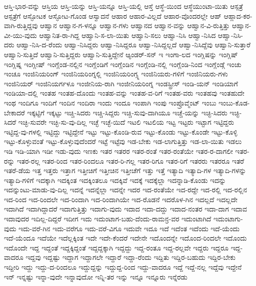 {ಆಸ್ತಿ-ಭಾರ-ವನ್ನು
ಆಸ್ತಿಯ
ಆಸ್ತಿ-ಯನ್ನು
ಆಸ್ತಿ-ಯನ್ನೂ
ಆಸ್ತಿ-ಯಲ್ಲಿ
ಆಸ್ತೆ
ಆಸ್ಥೆ-ಯಿಂದ
ಆಸ್ಥೆಯುಂಟಾ-ಯಿತು
ಆಸ್ಪತ್ರೆ
ಆಸ್ಪತ್ರೆಗೆ
ಆಸ್ಫೋಟಕ
ಆಸ್ಫೋಟ-ಗೊಂಡ
ಆಸ್ವಾದನೆ
ಆಹಾರ
ಆಹಾರ-ವಿಲ್ಲದೆ
ಆಹಾರ-ವೊಂದರಲ್ಲೇ
ಆಹ್
ಆಹ್ಲಾದ-ಕರ-ವಾಗಿ-ರುತ್ತಿದ್ದವು
ಆಹ್ವಾನ
ಆಹ್ವಾನ-ಗ-ಳನ್ನೂ
ಆಹ್ವಾನ-ಗಳು
ಆಹ್ವಾನದ
ಆಹ್ವಾನ-ವನ್ನು
ಆಹ್ವಾನ-ವಿ-ರುತ್ತಿತ್ತು
ಆಹ್ವಾನ-ವೀ-ಯು-ವುದು
ಆಹ್ವಾನಿತ-ರಾ-ಗಿದ್ದ
ಆಹ್ವಾನಿ-ಸ-ಲಾ-ಯಿತು
ಆಹ್ವಾನಿ-ಸಲು
ಆಹ್ವಾ-ನಿಸಿ
ಆಹ್ವಾ-ನಿಸಿದ
ಆಹ್ವಾ-ನಿಸಿ-ದರು
ಆಹ್ವಾ-ನಿಸಿ-ದ-ರೆಂದು
ಆಹ್ವಾ-ನಿಸಿದ್ದರು
ಆಹ್ವಾ-ನಿಸಿದ್ದರೂ
ಆಹ್ವಾ-ನಿಸಿದ್ದಲ್ಲದೆ
ಆಹ್ವಾ-ನಿಸಿದ್ದೆವು
ಆಹ್ವಾನಿ-ಸುತ್ತಾರೆ
ಆಹ್ವಾನಿ-ಸುತ್ತಿದೆ
ಆಹ್ವಾನಿ-ಸುತ್ತಿದ್ದರು
ಆಹ್ವಾನಿ-ಸುತ್ತಿದ್ದೇನೆ
ಆ್ಯಂಡರ್-ಸನ್
ಇ
ಇಂಗಾ-ಲದ
ಇಂಗ್ಲಿಷನ್ನು
ಇಂಗ್ಲಿಷ್
ಇಂಗ್ಲಿಷ್ನ
ಇಂಗ್ಲೀಷ್
ಇಂಗ್ಲೆಂಡ-ನಲ್ಲಿನ
ಇಂಗ್ಲೆಂಡಿಗೆ
ಇಂಗ್ಲೆಂಡಿನ
ಇಂಗ್ಲೆಂಡಿ-ನಲ್ಲಿ
ಇಂಗ್ಲೆಂಡಿ-ನಿಂದ
ಇಂಗ್ಲೆಂಡ್ಗೆ
ಇಂಚು
ಇಂಚೂ
ಇಂಜಿನಿಯರಿಂಗ್
ಇಂಜಿನಿಯರಿಂಗ್ನಲ್ಲಿ
ಇಂಜಿನಿಯರಿಂಗ್ಸ್ನ
ಇಂಜಿನಿಯರು-ಗಳಿಗೆ
ಇಂಜಿನಿಯರು-ಗಳು
ಇಂಜಿನಿಯರ್
ಇಂಜಿನಿಯರ್ಗಳೂ
ಇಂಜೀನಿಯ-ರಾಗಿ
ಇಂಜೀನಿಯರಿಂಗ್ನ
ಇಂಡಸ್ಟ್ರೀಸ್
ಇಂಡಿ-ಯನ್
ಇಂಡಿಯಾಗೆ
ಇಂಡಿಯಾ-ದಲ್ಲಿ
ಇಂತಹ
ಇಂತಹ-ದೊಂದು
ಇಂತಹ-ವನ್ನು
ಇಂತಹ-ವ-ರಿಗೆ
ಇಂತಹ-ವರು
ಇಂತಹವು
ಇಂತಹುದೇ
ಇಂಥ
ಇಂದಿಗೂ
ಇಂದಿಗೆ
ಇಂದಿನ
ಇಂದಿರಾ
ಇಂದು
ಇಂದೂ
ಇಂಪಾಗಿ
ಇಂಪು
ಇಂಪ್ರೊವ್ಮೆಂಟ್
ಇಂಬು
ಇಂಬು-ಕೊಡ-ಬೇಕಾದರೆ
ಇಕ್ಕಟ್ಟಿಗೆ
ಇಕ್ಕಟ್ಟು
ಇಚ್ಚಿ-ಸಿದರು
ಇಚ್ಚಿ-ಸಿದ್ದರು
ಇಚ್ಚಿ-ಸುವು-ದಾಗಿಯೂ
ಇಚ್ಚೆ-ಯನ್ನು
ಇಚ್ಛಿ-ಸಿದರು
ಇಚ್ಛಿ-ಸಿದರೆ
ಇಚ್ಛಿ-ಸುವರೇ
ಇಚ್ಛಿ-ಸು-ವು-ದಿಲ್ಲ
ಇಚ್ಛೆ
ಇಚ್ಛೆ-ಯಿದೆ
ಇಟಲಿ
ಇಟಲಿಯ
ಇಟ್ಟ
ಇಟ್ಟರು
ಇಟ್ಟಾಗ
ಇಟ್ಟಿದ್ದರು
ಇಟ್ಟಿದ್ದ-ವು-ಗಳಲ್ಲಿ
ಇಟ್ಟಿದ್ದು
ಇಟ್ಟಿದ್ದೇನೆ
ಇಟ್ಟು
ಇಟ್ಟು-ಕೊಂಡಿ-ರುವ
ಇಟ್ಟು-ಕೊಂಡು
ಇಟ್ಟು-ಕೊಂಡೇ
ಇಟ್ಟು-ಕೊಳ್ಳಿ
ಇಟ್ಟು-ಕೊಳ್ಳುವಂತೆ
ಇಟ್ಟು-ಕೊಳ್ಳುವುದೆಂದರೆ
ಇಟ್ಟೆ
ಇಟ್ಟೆವು
ಇಡ-ಬೇಕು
ಇಡ-ಲಾಗುತ್ತಿತ್ತು
ಇಡ-ಲಾ-ಯಿತು
ಇಡಲು
ಇಡಿ
ಇಡಿ-ಯಾಗಿ
ಇಡೀ
ಇಡು-ವುದು
ಇಣಕು
ಇತರ
ಇತರರ
ಇತರ-ರಂತೆ
ಇತರ-ರಂತೆಯೇ
ಇತರ-ರ-ದಾಗಲೀ
ಇತರ-ರನ್ನು
ಇತರ-ರಲ್ಲ
ಇತರ-ರಿಂದ
ಇತರ-ರಿಂದಲೂ
ಇತರ-ರಿ-ಗಲ್ಲ
ಇತರ-ರಿಗೂ
ಇತರ-ರಿಗೆ
ಇತರರು
ಇತರರೂ
ಇತರೆ
ಇತರೆ-ಡೆಯ
ಇತ್ತ
ಇತ್ತರು
ಇತ್ತಾಗ
ಇತ್ತೀಚಿಗೆ
ಇತ್ತೀಚಿನ
ಇತ್ತೀಚೆಗೆ
ಇತ್ತು
ಇತ್ತೆ
ಇತ್ಯಾದಿ
ಇತ್ಯಾದಿ-ಗಳ
ಇತ್ಯಾದಿ-ಗಳನ್ನು
ಇತ್ಯಾದಿ-ಗಳಿಗೆ
ಇದಕ್ಕಾಗಿ
ಇದಕ್ಕಿಂತ
ಇದಕ್ಕಿಂತಲೂ
ಇದಕ್ಕಿವೆ
ಇದಕ್ಕೆ
ಇದಕ್ಕೆಲ್ಲಾ
ಇದನ್ನಾಡಿ-ಕೊಂಡು
ಇದನ್ನು
ಇದನ್ನುಂಟು-ಮಾಡು-ವು-ದಿಲ್ಲ
ಇದನ್ನೆ
ಇದನ್ನೆಲ್ಲಾ
ಇದನ್ನೇ
ಇದರ
ಇದ-ರಂತೆಯೇ
ಇದ-ರದ್ದೇ
ಇದ-ರಲ್ಲಿ
ಇದ-ರಲ್ಲಿನ
ಇದ-ರಿಂದ
ಇದ-ರಿಂದಲೇ
ಇದ-ರಿಂದಾಗಿ
ಇದ-ರಿಂದಾಗಿಯೇ
ಇದ-ರೊಡನೆ
ಇದರೊಳ-ಗಿನ
ಇದಲ್ಲದೆ
ಇದಲ್ಲದೇ
ಇದಾಗಿದೆ
ಇದಾಗಿದ್ದಾದರೆ
ಇದಾಗುತ್ತಿತ್ತು
ಇದಾಗು-ವುದು
ಇದಾದ
ಇದಾ-ದದ್ದು
ಇದಾದ-ನಂತರ
ಇದಾ-ದಾಗ
ಇದಾವ
ಇದಾವುದರ
ಇದಿಲ್ಲ-ದಿದ್ದರೆ
ಇದೀಗ
ಇದು
ಇದುಂಟಾಗ-ಬಹು-ದೆಂದು-ರಾಮನ್ರ-ವರ
ಇದುಂಟಾಗಿದೆ
ಇದುಂಟಾಗು-ವುದು
ಇದು-ವರೆ-ಗಿನ
ಇದು-ವರೆಗೂ
ಇದು-ವರೆ-ವಿಗೂ
ಇದುವೇ
ಇದೂ
ಇದೆ
ಇದೆಂತ
ಇದೆಂದು
ಇದೆ-ಯೆಂದು
ಇದೆ-ಯೆಂದೂ
ಇದೆಯೇ
ಇದೆಲ್ಲಕ್ಕಿಂತ
ಇದೇ
ಇದೇ-ಕೆಂದರೆ
ಇದೇನೇ
ಇದೊಂದನ್ನೇ
ಇದೊಂದ-ರಿಂದಲೇ
ಇದೊಂದು
ಇದೊಂದೇ
ಇದ್ದ
ಇದ್ದಂತೆ
ಇದ್ದಕ್ಕಿದ್ದಂತೆ
ಇದ್ದದ್ದಕ್ಕಾಗಿ
ಇದ್ದದ್ದು
ಇದ್ದ-ರಂತೂ
ಇದ್ದ-ರಲ್ಲವೇ
ಇದ್ದರು
ಇದ್ದರೂ
ಇದ್ದ-ವಾದರೂ
ಇದ್ದವು
ಇದ್ದಷ್ಟು
ಇದ್ದಾಗ
ಇದ್ದಾಗಲೇ
ಇದ್ದಾರೆ
ಇದ್ದಾ-ರೆಂದು
ಇದ್ದಿತು
ಇದ್ದಿರ-ಬಹುದು
ಇದ್ದಿರ-ಬೇಕು
ಇದ್ದೀರಿ
ಇದ್ದು
ಇದ್ದು-ದ-ರಿಂದಲೂ
ಇದ್ದುದ್ದನ್ನು
ಇದ್ದುದ್ದ-ರಿಂದ
ಇದ್ದು-ವಾದರೂ
ಇದ್ದೆ
ಇದ್ದೆ-ನಲ್ಲ
ಇದ್ದೆವು
ಇದ್ದೇನೆ
ಇನ್
ಇನ್ನಷ್ಟು
ಇನ್ನಾ-ವುದೇ
ಇನ್ನಾವುದೋ
ಇನ್ನಿ-ತರ
ಇನ್ನು
ಇನ್ನೂ
ಇನ್ನೂರು
ಇನ್ನೆರಡು
}
